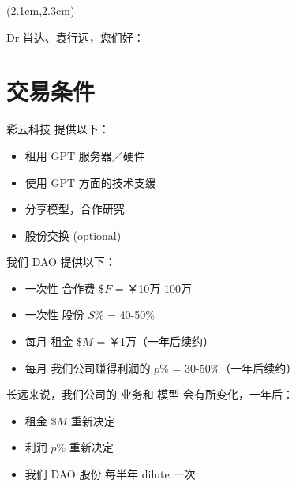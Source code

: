 \begin{preview}

\cc{
\title{\vspace{-1.5cm} \bfseries\color{blue}{\LARGE 《彩云科技》 \& 《渡过雪原》 商业合作建议}}
}{
\title{\vspace{-1.5cm} \bfseries\color{blue}{\LARGE Colorful Cloud business proposal}}
}

\date{\vspace{-2cm}} %

\maketitle

\setcounter{section}{-1}

\begin{textblock*}{5cm}(2.1cm,2.3cm) %
{}
\end{textblock*}

\begin{minipage}{\textwidth}
\setlength{\parskip}{0.4\baselineskip}

Dr 肖达、袁行远，您们好：

\section{交易条件}

彩云科技 提供以下：
\begin{itemize}
	\item 租用 GPT 服务器／硬件
	\item 使用 GPT 方面的技术支缓
	\item 分享模型，合作研究
	\item 股份交换 (optional)
\end{itemize}

我们 DAO 提供以下：
\begin{itemize}
	\item 一次性 合作费 \$$F$ = ￥10万-100万
	\item 一次性 股份 $S$\% = 40-50\%
	\item 每月 租金 \$$M$ = ￥1万（一年后续约）
	\item 每月 我们公司赚得利润的 $p$\% = 30-50\%（一年后续约）
\end{itemize}

长远来说，我们公司的 业务和 模型 会有所变化，一年后：
\begin{itemize}
	\item 租金 \$$M$ 重新决定
	\item 利润 $p$\% 重新决定
	\item 我们 DAO 股份 每半年 dilute 一次
\end{itemize}

\end{minipage}
\end{preview}

